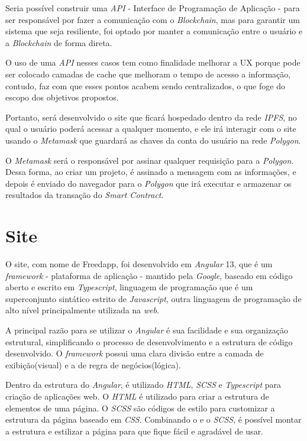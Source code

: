 Seria possível construir uma \textit{API} - Interface de Programação de Aplicação - para ser responsável por fazer a comunicação com o \textit{Blockchain}, mas para garantir um sistema que seja resiliente, foi optado por manter a comunicação entre o usuário e a \textit{Blockchain} de forma direta. 

O uso de uma \textit{API} nesses casos tem como finalidade melhorar a UX porque pode ser colocado camadas de cache que melhoram o tempo de acesso a informação, contudo, faz com que esses pontos acabem sendo centralizados, o que foge do escopo dos objetivos propostos.

Portanto, será desenvolvido o site que ficará hospedado dentro da rede \textit{IPFS}, no qual o usuário poderá acessar a qualquer momento, e ele irá interagir com o site usando o \textit{Metamask} que guardará as chaves da conta do usuário na rede \textit{Polygon}.

O \textit{Metamask} será o responsável por assinar qualquer requisição para a \textit{Polygon}. Dessa forma, ao criar um projeto, é assinado a mensagem com as informações, e depois é enviado do navegador para o \textit{Polygon} que irá executar e armazenar os resultados da transação do \textit{Smart Contract}.

\section{Site}


O site, com nome de Freedapp, foi desenvolvido em \textit{Angular} 13, que é um \textit{framework} - plataforma de aplicação - mantido pela \textit{Google}, baseado em código aberto e escrito em \textit{Typescript}, linguagem de programação que é um superconjunto sintático estrito de \textit{Javascript}, outra linguagem de programação de alto nível principalmente utilizada na \textit{web}.

A principal razão para se utilizar o \textit{Angular} é sua facilidade e sua organização estrutural, simplificando o processo de desenvolvimento e a estrutura de código desenvolvido. O \textit{framework} possui uma clara divisão entre a camada de exibição(visual) e a de regra de negócios(lógica).

Dentro da estrutura do \textit{Angular}, é utilizado \textit{HTML}, \textit{SCSS} e \textit{Typescript} para criação de aplicações web. O \textit{HTML} é utilizado para criar a estrutura de elementos de uma página. O \textit{SCSS} são códigos de estilo para customizar a estrutura da página baseado em \textit{CSS}. Combinando o  e o \textit{SCSS}, é possível montar a estrutura e estilizar a página para que fique fácil e agradável de usar. 

